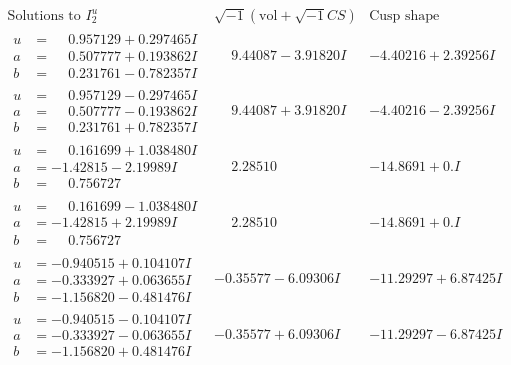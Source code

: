 \documentclass[1p]{elsarticle_modified}
\theoremstyle{definition}
\newcommand{\I}{\sqrt{-1}}
\begin{document}
$$\begin{array}{c|c|c}  
\text{Solutions to }I^u_{2}& \I (\text{vol} + \sqrt{-1}CS) & \text{Cusp shape}\\
 \hline 
\begin{aligned}
u &= \phantom{-}0.957129 + 0.297465 I \\
a &= \phantom{-}0.507777 + 0.193862 I \\
b &= \phantom{-}0.231761 - 0.782357 I\end{aligned}
 & \phantom{-}9.44087 - 3.91820 I & -4.40216 + 2.39256 I \\ \hline\begin{aligned}
u &= \phantom{-}0.957129 - 0.297465 I \\
a &= \phantom{-}0.507777 - 0.193862 I \\
b &= \phantom{-}0.231761 + 0.782357 I\end{aligned}
 & \phantom{-}9.44087 + 3.91820 I & -4.40216 - 2.39256 I \\ \hline\begin{aligned}
u &= \phantom{-}0.161699 + 1.038480 I \\
a &= -1.42815 - 2.19989 I \\
b &= \phantom{-}0.756727\phantom{ +0.000000I}\end{aligned}
 & \phantom{-}2.28510\phantom{ +0.000000I} & -14.8691 + 0. I\phantom{ +0.000000I} \\ \hline\begin{aligned}
u &= \phantom{-}0.161699 - 1.038480 I \\
a &= -1.42815 + 2.19989 I \\
b &= \phantom{-}0.756727\phantom{ +0.000000I}\end{aligned}
 & \phantom{-}2.28510\phantom{ +0.000000I} & -14.8691 + 0. I\phantom{ +0.000000I} \\ \hline\begin{aligned}
u &= -0.940515 + 0.104107 I \\
a &= -0.333927 + 0.063655 I \\
b &= -1.156820 - 0.481476 I\end{aligned}
 & -0.35577 - 6.09306 I & -11.29297 + 6.87425 I \\ \hline\begin{aligned}
u &= -0.940515 - 0.104107 I \\
a &= -0.333927 - 0.063655 I \\
b &= -1.156820 + 0.481476 I\end{aligned}
 & -0.35577 + 6.09306 I & -11.29297 - 6.87425 I \\ \hline\begin{aligned}

\end{aligned}
\end{array}$$
\end{document}
